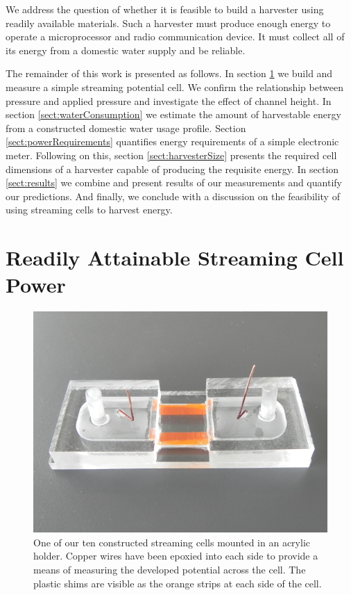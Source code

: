 \documentclass[10pt,final,journal]{IEEEtran}
\begin{document}

    We address the question of whether it is feasible to build a harvester using readily available materials.
    Such a harvester must produce enough energy to operate a microprocessor and radio communication device.
    It must collect all of its energy from a domestic water supply and be reliable.

    The remainder of this work is presented as follows.
    In section \ref{sect:streamingCell} we build and measure a simple streaming potential cell.
    We confirm the relationship between pressure and applied pressure and investigate the effect of channel height.
    In section \ref{sect:waterConsumption} we estimate the amount of harvestable energy from a constructed domestic water usage profile.
    Section \ref{sect:powerRequirements} quantifies energy requirements of a simple electronic meter.
    Following on this, section \ref{sect:harvesterSize} presents the required cell dimensions of a harvester capable of producing the requisite energy.
    In section \ref{sect:results} we combine and present results of our measurements and quantify our predictions.
    And finally, we conclude with a discussion on the feasibility of using streaming cells to harvest energy.

    \section{Readily Attainable Streaming Cell Power} \label{sect:streamingCell}
    \begin{figure}
        \begin{center}
        \includegraphics[width=\linewidth]{Photo_streamingPotential_Assembly_Step3.JPG}
        \end{center}
        \caption{One of our ten constructed streaming cells mounted in an acrylic holder. Copper wires have been epoxied into each side to provide a means of measuring the developed potential across the cell. The plastic shims are visible as the orange strips at each side of the cell.}
        \label{fig:cell}
    \end{figure}
\end{document}
